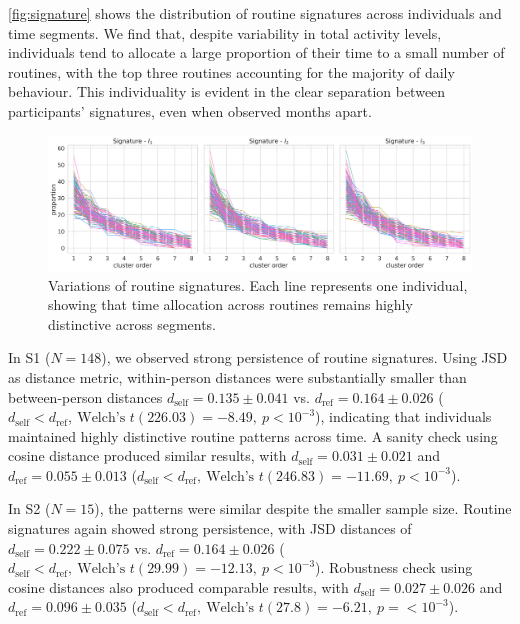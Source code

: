 \documentclass[pdflatex,sn-vancouver,Numbered]{bst/sn-jnl}%
\theoremstyle{thmstyleone}%
\theoremstyle{thmstyletwo}%
\theoremstyle{thmstylethree}%
\newcommand{\dself}[2]{$d_{\text{self}} = #1 \pm #2$}
\newcommand{\dref}[2]{$d_{\text{ref}} = #1 \pm #2$}
\newcommand{\dselfdrefp}[3]{$d_{\text{self}} < d_{\text{ref}},\ \text{Welch's } t(#1) = #2,\ p = #3$}
\newcommand{\dselfdrefpl}[3]{$d_{\text{self}} < d_{\text{ref}},\ \text{Welch's } t(#1) = #2,\ p < #3$}
\begin{document}
\autoref{fig:signature} shows the distribution of routine signatures across individuals and time segments. We find that, despite variability in total activity levels, individuals tend to allocate a large proportion of their time to a small number of routines, with the top three routines accounting for the majority of daily behaviour. This individuality is evident in the clear separation between participants’ signatures, even when observed months apart.

\begin{figure}[h!]
    \centering
    \includegraphics[width=1\linewidth]{figures/tesserae_signature.png}
    \caption{Variations of routine signatures. Each line represents one individual, showing that time allocation across routines remains highly distinctive across segments.}
    \label{fig:signature}
\end{figure}

In S1 (\(N=148\)), we observed strong persistence of routine signatures. Using JSD as distance metric, within-person distances were substantially smaller than between-person distances \dself{0.135}{0.041} vs. \dref{0.164}{0.026} (\dselfdrefpl{226.03}{-8.49}{10^{-3}}), indicating that individuals maintained highly distinctive routine patterns across time. A sanity check using cosine distance produced similar results, with \dself{0.031}{0.021} and \dref{0.055}{0.013} (\dselfdrefpl{246.83}{-11.69}{10^{-3}}).

In S2 (\(N=15\)), the patterns were similar despite the smaller sample size. Routine signatures again showed strong persistence, with JSD distances of \dself{0.222}{0.075} vs. \dref{0.164}{0.026} (\dselfdrefpl{29.99}{-12.13}{10^{-3}}). Robustness check using cosine distances also produced comparable results, with \dself{0.027}{0.026} and \dref{0.096}{0.035} (\dselfdrefp{27.8}{-6.21}{< 10^{-3}}).
\end{document}

